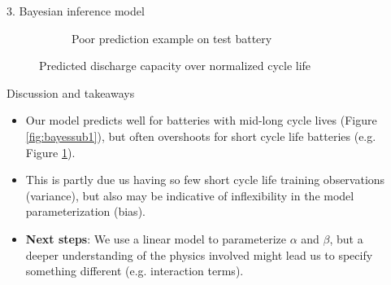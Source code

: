 \documentclass[final]{beamer}
\newlength{\sepwidth}
\newlength{\colwidth}
\newcommand{\separatorcolumn}{\begin{column}{\sepwidth}\end{column}}
\begin{document}
\begin{frame}[t]
\begin{columns}[t]
\begin{column}{\colwidth}
\begin{block}{3. Bayesian inference model}
\begin{figure}[H]
\begin{subfigure}[b]{0.49\linewidth}
            \caption{Poor prediction example on test battery}
            \label{fig:bayessub2}
        \end{subfigure}
        \caption{Predicted discharge capacity over normalized cycle life}
        \label{fig:bayespred}
    \end{figure}
\end{block}
    \begin{alertblock}{\small Discussion and takeaways}

    \begin{itemize}
    \item Our model predicts well for batteries with mid-long cycle lives (Figure \ref{fig:bayessub1}), but often overshoots for short cycle life batteries (e.g. Figure \ref{fig:bayessub2}).
    
    \item This is partly due us having so few short cycle life training observations (variance), but also may be indicative of inflexibility in the model parameterization (bias).
    
    \item \textbf{Next steps}: We use a linear model to parameterize $\alpha$ and $\beta$, but a deeper understanding of the physics involved might lead us to specify something different (e.g. interaction terms).
    
    \end{itemize}


  \end{alertblock}

\end{column}

\separatorcolumn
\end{columns}
\vfill
\begin{block}

    \nocite{*}
    \footnotesize{}

\end{block}

\end{frame}
\end{document}
